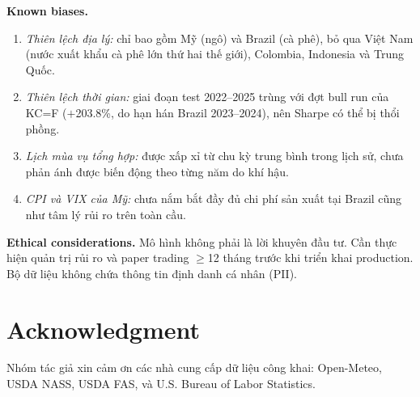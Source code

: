 \documentclass[conference]{IEEEtran}
\begin{document}
\textbf{Known biases.}
\begin{enumerate}
\item \textit{Thiên lệch địa lý:} chỉ bao gồm Mỹ (ngô) và Brazil (cà phê),
bỏ qua Việt Nam (nước xuất khẩu cà phê lớn thứ hai thế giới), Colombia,
Indonesia và Trung Quốc.
\item \textit{Thiên lệch thời gian:} giai đoạn test 2022--2025 trùng với đợt
bull run của KC=F ($+$203.8\%, do hạn hán Brazil 2023--2024), nên Sharpe có
thể bị thổi phồng.
\item \textit{Lịch mùa vụ tổng hợp:} được xấp xỉ từ chu kỳ trung bình trong
lịch sử, chưa phản ánh được biến động theo từng năm do khí hậu.
\item \textit{CPI và VIX của Mỹ:} chưa nắm bắt đầy đủ chi phí sản xuất tại
Brazil cũng như tâm lý rủi ro trên toàn cầu.
\end{enumerate}

\textbf{Ethical considerations.} Mô hình không phải là lời khuyên đầu tư. Cần
thực hiện quản trị rủi ro và paper trading $\geq$12 tháng trước khi triển khai
production. Bộ dữ liệu không chứa thông tin định danh cá nhân (PII).

\section*{Acknowledgment}

Nhóm tác giả xin cảm ơn các nhà cung cấp dữ liệu công khai: Open-Meteo,
USDA NASS, USDA FAS, và U.S. Bureau of Labor Statistics.
\end{document}
